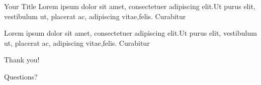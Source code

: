 \documentclass[aspectratio  =  169, 15pt]{beamer}
\begin{document}
    \begin{frame}{Your Title}
        Lorem ipsum dolor sit amet, consectetuer adipiscing elit.Ut purus elit, vestibulum ut, placerat ac, adipiscing vitae,felis. Curabitur
    \end{frame}
    
    \begin{frame}
        Lorem ipsum dolor sit amet, consectetuer adipiscing elit.Ut purus elit, vestibulum ut, placerat ac, adipiscing vitae,felis. Curabitur
    \end{frame}
    
    
    \begin{frame}[standout]
        Thank you!
        
        Questions?
        
        \begin{columns}[t]
            \myauthor
            \vspace*{-25pt}
            \mydocumentfulltitle
        \end{columns}
    \end{frame}
\end{document}
